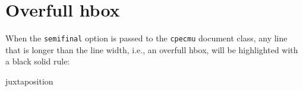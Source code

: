 







\section{Overfull hbox}

When the \verb.semifinal. option is passed to the \verb.cpecmu. document class,
any line that is longer than the line width, i.e., an overfull hbox, will be
highlighted with a black solid rule:
\begin{center}
\begin{minipage}{10em}
juxtaposition
\end{minipage}
\end{center}

